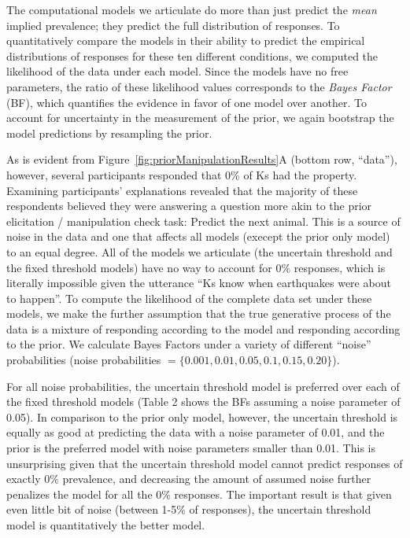 \documentclass[floatsintext,doc]{apa6}
\theoremstyle{definition}
\theoremstyle{definition}
\theoremstyle{definition}
\theoremstyle{remark}
\begin{document}
The computational models we articulate do more than just predict the
\emph{mean} implied prevalence; they predict the full distribution of
responses. To quantitatively compare the models in their ability to
predict the empirical distributions of responses for these ten different
conditions, we computed the likelihood of the data under each model.
Since the models have no free parameters, the ratio of these likelihood
values corresponds to the \emph{Bayes Factor} (BF), which quantifies the
evidence in favor of one model over another. To account for uncertainty
in the measurement of the prior, we again bootstrap the model
predictions by resampling the prior.

As is evident from Figure~\ref{fig:priorManipulationResults}A (bottom
row, \enquote{data}), however, several participants responded that 0\%
of Ks had the property. Examining participants' explanations revealed
that the majority of these respondents believed they were answering a
question more akin to the prior elicitation / manipulation check task:
Predict the next animal. This is a source of noise in the data and one
that affects all models (execept the prior only model) to an equal
degree. All of the models we articulate (the uncertain threshold and the
fixed threshold models) have no way to account for 0\% responses, which
is literally impossible given the utterance \enquote{Ks know when
earthquakes were about to happen}. To compute the likelihood of the
complete data set under these models, we make the further assumption
that the true generative process of the data is a mixture of responding
according to the model and responding according to the prior. We
calculate Bayes Factors under a variety of different \enquote{noise}
probabilities (noise probabilities
\(= \{0.001, 0.01, 0.05, 0.1, 0.15, 0.20\}\)).

For all noise probabilities, the uncertain threshold model is preferred
over each of the fixed threshold models (Table 2 shows the BFs assuming
a noise parameter of 0.05). In comparison to the prior only model,
however, the uncertain threshold is equally as good at predicting the
data with a noise parameter of 0.01, and the prior is the preferred
model with noise parameters smaller than 0.01. This is unsurprising
given that the uncertain threshold model cannot predict responses of
exactly 0\% prevalence, and decreasing the amount of assumed noise
further penalizes the model for all the 0\% responses. The important
result is that given even little bit of noise (between 1-5\% of responses),
the uncertain threshold model is quantitatively the better model.
\end{document}
